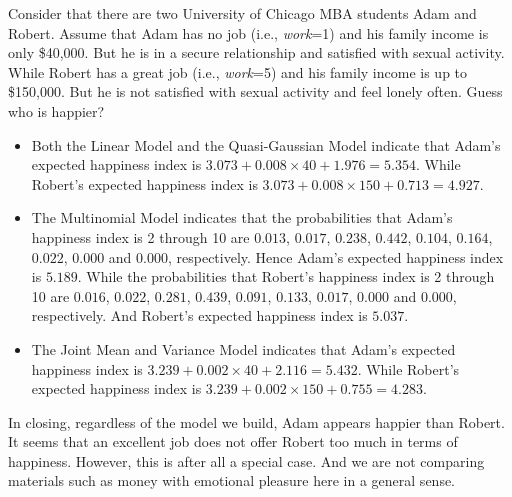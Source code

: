 \documentclass[11pt,letterpaper]{article}
\begin{document}
Consider that there are two University of Chicago MBA students Adam and Robert. Assume that Adam has no job (i.e., \emph{work}=1) and his family income is only \$40,000. But he is in a secure relationship and satisfied with sexual activity. While Robert has a great job (i.e., \emph{work}=5) and his family income is up to \$150,000. But he is not satisfied with sexual activity and feel lonely often. Guess who is happier? \par
\begin{itemize}
\item Both the Linear Model and the Quasi-Gaussian Model indicate that Adam's expected happiness index is $3.073+0.008\times 40+1.976=\mathbf{5.354}$. While Robert's expected happiness index is $3.073+0.008\times 150+0.713=\mathbf{4.927}$.
\item The Multinomial Model indicates that the probabilities that Adam's happiness index is 2 through 10 are $0.013$, $0.017$, $0.238$, $0.442$, $0.104$, $0.164$, $0.022$, $0.000$ and $0.000$, respectively. Hence Adam's expected happiness index is $\mathbf{5.189}$. While the probabilities that Robert's happiness index is 2 through 10 are $0.016$, $0.022$, $0.281$, $0.439$, $0.091$, $0.133$, $0.017$, $0.000$ and $0.000$, respectively. And Robert's expected happiness index is $\mathbf{5.037}$.
\item The Joint Mean and Variance Model indicates that Adam's expected happiness index is $3.239+0.002\times 40+2.116=\mathbf{5.432}$. While Robert's expected happiness index is $3.239+0.002\times 150+0.755=\mathbf{4.283}$.
\end{itemize}
In closing, regardless of the model we build, Adam appears happier than Robert. It seems that an excellent job does not offer Robert too much in terms of happiness. However, this is after all a special case. And we are not comparing materials such as money with emotional pleasure here in a general sense.
\end{document}
